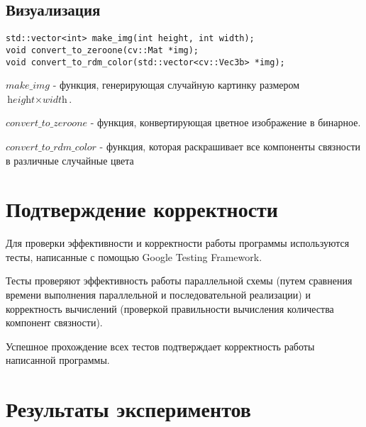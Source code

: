 \documentclass{report}
\begin{document}
\subsection*{Визуализация}
\begin{lstlisting}
std::vector<int> make_img(int height, int width);
void convert_to_zeroone(cv::Mat *img);
void convert_to_rdm_color(std::vector<cv::Vec3b> *img);
\end{lstlisting}

\par \textit{$make\_img$} - функция, генерирующая случайную картинку размером
\\\begin{math} \textit{height} \times \textit{width} \end{math}.

\textit{$convert\_to\_zeroone$} - функция, конвертирующая цветное изображение в бинарное.

\textit{$convert\_to\_rdm\_color$} - функция, которая раскрашивает все компоненты связности в различные случайные цвета

\newpage

\section*{Подтверждение корректности}
Для проверки эффективности и корректности работы программы используются тесты, написанные с помощью Google Testing Framework.
\par Тесты проверяют эффективность работы параллельной схемы (путем сравнения времени выполнения параллельной и последовательной реализации) и корректность вычислений (проверкой правильности вычисления количества компонент связности).

\par Успешное прохождение всех тестов подтверждает корректность работы написанной программы.

\newpage

\section*{Результаты экспериментов}
\end{document}
